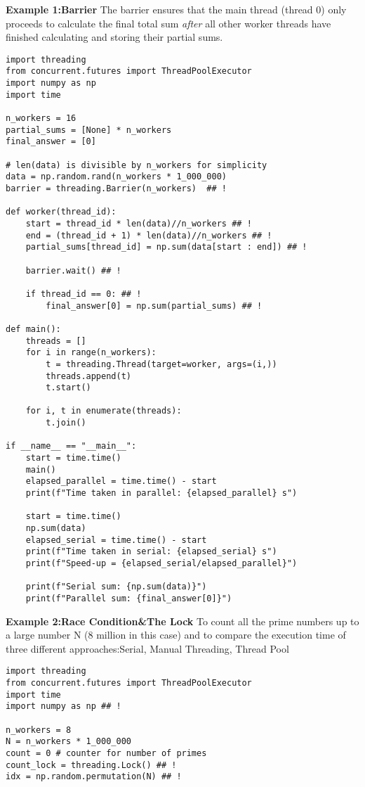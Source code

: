 \documentclass[10pt, a4paper]{article}
\begin{document}
\begin{multicols}{3}
\columnbreak %
\textbf{Example 1:Barrier}
The barrier ensures that the main thread (thread 0) only proceeds to calculate the final total sum \textit{after} all other worker threads have finished calculating and storing their partial sums.
\begin{lstlisting}[style=pythoncompact]
import threading
from concurrent.futures import ThreadPoolExecutor
import numpy as np
import time

n_workers = 16
partial_sums = [None] * n_workers
final_answer = [0]

# len(data) is divisible by n_workers for simplicity
data = np.random.rand(n_workers * 1_000_000) 
barrier = threading.Barrier(n_workers)  ## !

def worker(thread_id):
    start = thread_id * len(data)//n_workers ## !
    end = (thread_id + 1) * len(data)//n_workers ## !
    partial_sums[thread_id] = np.sum(data[start : end]) ## !

    barrier.wait() ## !

    if thread_id == 0: ## !
        final_answer[0] = np.sum(partial_sums) ## !

def main():
    threads = []
    for i in range(n_workers):
        t = threading.Thread(target=worker, args=(i,))
        threads.append(t)
        t.start()
    
    for i, t in enumerate(threads):
        t.join()
    
if __name__ == "__main__":
    start = time.time()
    main()
    elapsed_parallel = time.time() - start
    print(f"Time taken in parallel: {elapsed_parallel} s")

    start = time.time()
    np.sum(data)
    elapsed_serial = time.time() - start
    print(f"Time taken in serial: {elapsed_serial} s")
    print(f"Speed-up = {elapsed_serial/elapsed_parallel}")

    print(f"Serial sum: {np.sum(data)}")
    print(f"Parallel sum: {final_answer[0]}")
\end{lstlisting}

\textbf{Example 2:Race Condition\&The Lock}
To count all the prime numbers up to a large number N (8 million in this case) and to compare the execution time of three different approaches:Serial, Manual Threading, Thread Pool
\begin{lstlisting}[style=pythoncompact]
import threading
from concurrent.futures import ThreadPoolExecutor
import time
import numpy as np ## !

n_workers = 8
N = n_workers * 1_000_000
count = 0 # counter for number of primes
count_lock = threading.Lock() ## !
idx = np.random.permutation(N) ## !


\end{lstlisting}
\end{multicols}
\end{document}
